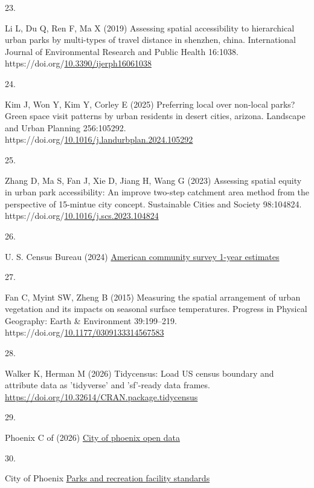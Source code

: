\documentclass[
  sn-basic,
]{sn-jnl}
\newlength{\cslhangindent}
\newlength{\csllabelwidth}
\newenvironment{CSLReferences}[2] %
 {\begin{list}{}{%
  \setlength{\itemindent}{0pt}
  \setlength{\leftmargin}{0pt}
  \setlength{\parsep}{0pt}
  \ifodd #1
   \setlength{\leftmargin}{\cslhangindent}
   \setlength{\itemindent}{-1\cslhangindent}
  \fi
  \setlength{\itemsep}{#2\baselineskip}}}
 {\end{list}}
\newcommand{\CSLLeftMargin}[1]{\parbox[t]{\csllabelwidth}{\strut#1\strut}}
\newcommand{\CSLRightInline}[1]{\parbox[t]{\linewidth - \csllabelwidth}{\strut#1\strut}}
\begin{document}
\begin{CSLReferences}{0}{1}
\CSLLeftMargin{23. }%
\CSLRightInline{Li L, Du Q, Ren F, Ma X (2019) Assessing spatial
accessibility to hierarchical urban parks by multi-types of travel
distance in shenzhen, china. International Journal of Environmental
Research and Public Health 16:1038.
https://doi.org/\href{https://doi.org/10.3390/ijerph16061038}{10.3390/ijerph16061038}}

\CSLLeftMargin{24. }%
\CSLRightInline{Kim J, Won Y, Kim Y, Corley E (2025) Preferring local
over non-local parks? Green space visit patterns by urban residents in
desert cities, arizona. Landscape and Urban Planning 256:105292.
https://doi.org/\href{https://doi.org/10.1016/j.landurbplan.2024.105292}{10.1016/j.landurbplan.2024.105292}}

\CSLLeftMargin{25. }%
\CSLRightInline{Zhang D, Ma S, Fan J, Xie D, Jiang H, Wang G (2023)
Assessing spatial equity in urban park accessibility: An improve
two-step catchment area method from the perspective of 15-mintue city
concept. Sustainable Cities and Society 98:104824.
https://doi.org/\href{https://doi.org/10.1016/j.scs.2023.104824}{10.1016/j.scs.2023.104824}}

\CSLLeftMargin{26. }%
\CSLRightInline{U. S. Census Bureau (2024)
\href{http://censusreporter.org/profiles/16000US0455000-phoenix-az/}{American
community survey 1-year estimates}}

\CSLLeftMargin{27. }%
\CSLRightInline{Fan C, Myint SW, Zheng B (2015) Measuring the spatial
arrangement of urban vegetation and its impacts on seasonal surface
temperatures. Progress in Physical Geography: Earth \& Environment
39:199--219.
https://doi.org/\href{https://doi.org/10.1177/0309133314567583}{10.1177/0309133314567583}}

\CSLLeftMargin{28. }%
\CSLRightInline{Walker K, Herman M (2026) Tidycensus: Load US census
boundary and attribute data as 'tidyverse' and 'sf'-ready data frames.
\url{https://doi.org/10.32614/CRAN.package.tidycensus}}

\CSLLeftMargin{29. }%
\CSLRightInline{Phoenix C of (2026)
\href{https://www.phoenixopendata.com/}{City of phoenix open data}}

\CSLLeftMargin{30. }%
\CSLRightInline{City of Phoenix
\href{https://web-prod.phoenix.gov/content/dam/phoenix/pddsite/documents/planning-zoning-general-plan/parks-rec-facility-standards.pdf}{Parks
and recreation facility standards}}


\end{CSLReferences}
\end{document}
